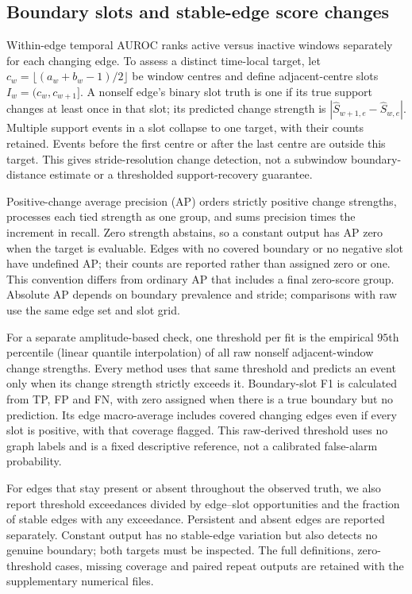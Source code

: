 \documentclass[11pt]{article}
\begin{document}
\subsection{Boundary slots and stable-edge score changes}
\label{app:direct-localisation}
Within-edge temporal AUROC ranks active versus inactive windows separately
for each changing edge. To assess a distinct
time-local target, let $c_w=\lfloor(a_w+b_w-1)/2\rfloor$ be window centres
and define adjacent-centre slots $I_w=(c_w,c_{w+1}]$. A nonself edge's binary
slot truth is one if its true support changes at least once in that slot;
its predicted change strength is $|\widehat S_{w+1,e}-\widehat S_{w,e}|$.
Multiple support events in a slot collapse to one target, with their counts
retained. Events before the first centre or after the last centre are outside
this target. This gives stride-resolution change detection, not a subwindow
boundary-distance estimate or a thresholded support-recovery guarantee.

Positive-change average precision (AP) orders strictly positive change
strengths, processes each tied strength as one group, and sums precision
times the increment in recall. Zero strength abstains, so a constant output
has AP zero when the target is evaluable. Edges with no covered boundary or
no negative slot have undefined AP; their counts are reported rather than
assigned zero or one. This convention differs from ordinary AP that includes
a final zero-score group. Absolute AP depends on boundary prevalence and
stride; comparisons with raw use the same edge set and slot grid.

For a separate amplitude-based check, one threshold per fit is the empirical
$95$th percentile (linear quantile interpolation) of all raw nonself
adjacent-window change strengths. Every method uses that same threshold
and predicts an event only when its change strength strictly exceeds it.
Boundary-slot F1 is calculated from TP, FP and FN, with zero assigned when
there is a true boundary but no prediction. Its edge macro-average includes
covered changing edges even if every slot is positive, with that coverage
flagged. This raw-derived threshold uses no graph labels and is a fixed
descriptive reference, not a calibrated false-alarm probability.

For edges that stay present or absent throughout the observed truth, we also
report threshold exceedances divided by edge--slot opportunities and the
fraction of stable edges with any exceedance. Persistent and absent edges
are reported separately. Constant output has no stable-edge variation but
also detects no genuine boundary; both targets must be inspected. The full
definitions, zero-threshold cases, missing coverage and paired repeat outputs
are retained with the supplementary numerical files.
\end{document}
